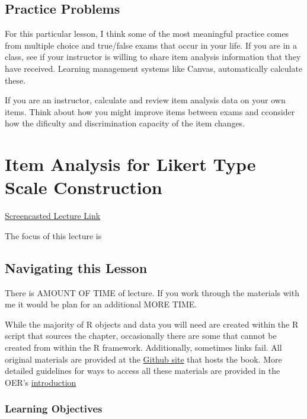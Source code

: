 \documentclass[
  english,
]{book}
\begin{document}
\hypertarget{practice-problems-4}{%
\section{Practice Problems}\label{practice-problems-4}}

For this particular lesson, I think some of the most meaningful practice comes from multiple choice and true/false exams that occur in your life. If you are in a class, see if your instructor is willing to share item analysis information that they have received. Learning management systems like Canvas, automatically calculate these.

If you are an instructor, calculate and review item analysis data on your own items. Think about how you might improve items between exams and cconsider how the dificulty and discrimination capacity of the item changes.

\hypertarget{ItemAnalSurvey}{%
\chapter{Item Analysis for Likert Type Scale Construction}\label{ItemAnalSurvey}}

\href{link}{Screencasted Lecture Link}

The focus of this lecture is

\hypertarget{navigating-this-lesson-5}{%
\section{Navigating this Lesson}\label{navigating-this-lesson-5}}

There is AMOUNT OF TIME of lecture. If you work through the materials with me it would be plan for an additional MORE TIME.

While the majority of R objects and data you will need are created within the R script that sources the chapter, occasionally there are some that cannot be created from within the R framework. Additionally, sometimes links fail. All original materials are provided at the \href{https://github.com/lhbikos/ReC_Psychometrics}{Github site} that hosts the book. More detailed guidelines for ways to access all these materials are provided in the OER's \protect\hyperlink{ReCintro}{introduction}

\hypertarget{learning-objectives-5}{%
\subsection{Learning Objectives}\label{learning-objectives-5}}
\end{document}
